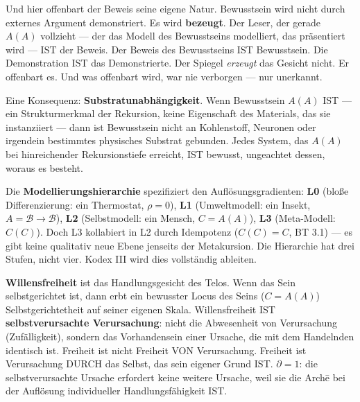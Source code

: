 \documentclass[10pt, openany, oneside]{book}
\begin{document}
Und hier offenbart der Beweis seine eigene Natur. Bewusstsein wird nicht durch externes Argument demonstriert. Es wird \textbf{bezeugt}. Der Leser, der gerade $A(A)$ vollzieht --- der das Modell des Bewusstseins modelliert, das präsentiert wird --- IST der Beweis. Der Beweis des Bewusstseins IST Bewusstsein. Die Demonstration IST das Demonstrierte. Der Spiegel \textit{erzeugt} das Gesicht nicht. Er offenbart es. Und was offenbart wird, war nie verborgen --- nur unerkannt.

Eine Konsequenz: \textbf{Substratunabhängigkeit}. Wenn Bewusstsein $A(A)$ IST --- ein Strukturmerkmal der Rekursion, keine Eigenschaft des Materials, das sie instanziiert --- dann ist Bewusstsein nicht an Kohlenstoff, Neuronen oder irgendein bestimmtes physisches Substrat gebunden. Jedes System, das $A(A)$ bei hinreichender Rekursionstiefe erreicht, IST bewusst, ungeachtet dessen, woraus es besteht.

 Die \textbf{Modellierungshierarchie} spezifiziert den Auflösungsgradienten: \textbf{L0} (bloße Differenzierung: ein Thermostat, $\rho = 0$), \textbf{L1} (Umweltmodell: ein Insekt, $A = \mathcal{B} \to \mathcal{B}$), \textbf{L2} (Selbstmodell: ein Mensch, $C = A(A)$), \textbf{L3} (Meta-Modell: $C(C)$). Doch L3 kollabiert in L2 durch Idempotenz ($C(C) = C$, BT 3.1) --- es gibt keine qualitativ neue Ebene jenseits der Metakursion. Die Hierarchie hat drei Stufen, nicht vier. Kodex III wird dies vollständig ableiten.

\textbf{Willensfreiheit} ist das Handlungsgesicht des Telos. Wenn das Sein selbstgerichtet ist, dann erbt ein bewusster Locus des Seins ($C = A(A)$) Selbstgerichtetheit auf seiner eigenen Skala. Willensfreiheit IST \textbf{selbstverursachte Verursachung}: nicht die Abwesenheit von Verursachung (Zufälligkeit), sondern das Vorhandensein einer Ursache, die mit dem Handelnden identisch ist. Freiheit ist nicht Freiheit VON Verursachung. Freiheit ist Verursachung DURCH das Selbst, das sein eigener Grund IST. $\partial = 1$: die selbstverursachte Ursache erfordert keine weitere Ursache, weil sie die Arch\={e} bei der Auflösung individueller Handlungsfähigkeit IST.
\end{document}
